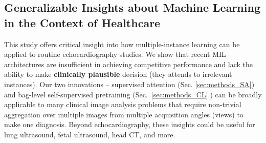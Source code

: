 
\subsection*{Generalizable Insights about Machine Learning in the Context of Healthcare}

This study offers critical insight into how multiple-instance learning can be applied to routine echocardiography studies. We show that recent MIL architectures are insufficient in achieving competitive performance and lack the ability to make \textbf{clinically plausible} decision (they attends to irrelevant instances). Our two innovations -- supervised attention (Sec. \ref{sec:methods_SA}) and bag-level self-supervised pretraining (Sec.~\ref{sec:methods_CL}.) can be broadly applicable to many clinical image analysis problems that require non-trivial aggregation over multiple images from multiple acquisition angles (views) to make one diagnosis. Beyond echocardiography, these insights could be useful for lung ultrasound, fetal ultrasound, head CT, and more.
